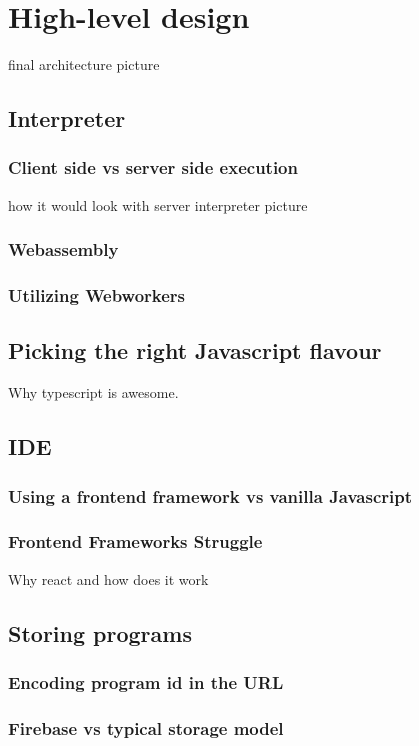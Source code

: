 \chapter{High-level design}
final architecture picture

\section{Interpreter}

\subsection{Client side vs server side execution}
how it would look with server interpreter picture

\subsection{Webassembly}

\subsection{Utilizing Webworkers}

\section{Picking the right Javascript flavour}
Why typescript is awesome.

\section{IDE}

\subsection{Using a frontend framework vs vanilla Javascript}

\subsection{Frontend Frameworks Struggle}
Why react and how does it work

\section{Storing programs}

\subsection{Encoding program id in the URL}

\subsection{Firebase vs typical storage model}

